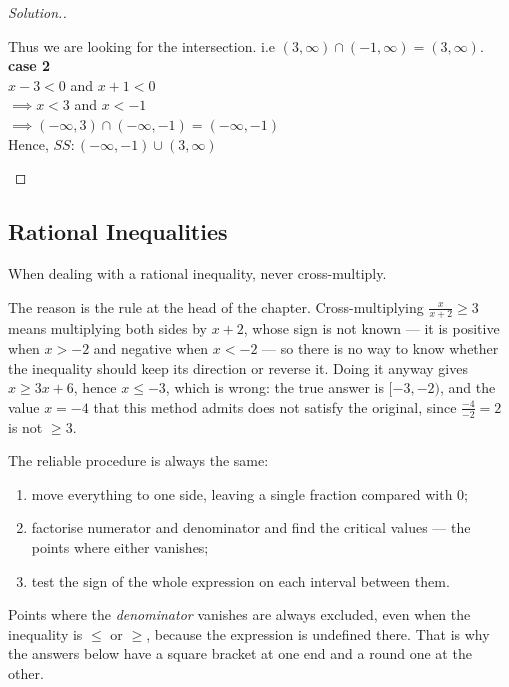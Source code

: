 \documentclass[11pt,a4paper]{article}
\theoremstyle{definition}
\newenvironment{solution}
  {\renewcommand{\qedsymbol}{}\begin{proof}[\textit{Solution}.]}
  {\end{proof}}
\begin{document}
\begin{solution}
\begin{enumerate}
Thus we  are looking for the intersection. i.e $(3,\infty)\cap (-1,\infty)=(3,\infty)$.\\

\textbf{case 2}\\
$x-3<0$ and $x+1<0$\\
$\implies x<3$ and $x<-1$\\
$\implies (-\infty,3)\cap (-\infty,-1)=(-\infty,-1)$\\

Hence, $SS:(-\infty,-1)\cup (3,\infty)$\\
\end{enumerate}
\end{solution}
\subsection{Rational Inequalities}
When dealing with a rational inequality, never cross-multiply.

The reason is the rule at the head of the chapter. Cross-multiplying
$\frac{x}{x+2}\geq 3$ means multiplying both sides by $x+2$, whose sign is not
known --- it is positive when $x>-2$ and negative when $x<-2$ --- so there is no way
to know whether the inequality should keep its direction or reverse it. Doing it
anyway gives $x\geq 3x+6$, hence $x\leq-3$, which is wrong: the true answer is
$[-3,-2)$, and the value $x=-4$ that this method admits does not satisfy the
original, since $\frac{-4}{-2}=2$ is not $\geq 3$.

The reliable procedure is always the same:
\begin{enumerate}
\item[(i).] move everything to one side, leaving a single fraction compared with $0$;
\item[(ii).] factorise numerator and denominator and find the critical values --- the
points where either vanishes;
\item[(iii).] test the sign of the whole expression on each interval between them.
\end{enumerate}
Points where the \emph{denominator} vanishes are always excluded, even when the
inequality is $\leq$ or $\geq$, because the expression is undefined there. That is
why the answers below have a square bracket at one end and a round one at the
other.\\
\end{document}
